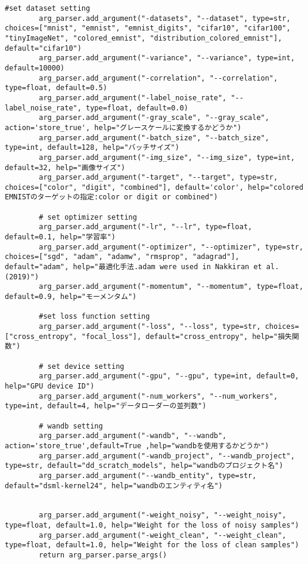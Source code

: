 \begin{lstlisting}[style=pythonstyle, caption={メインコード}]
        #set dataset setting
        arg_parser.add_argument("-datasets", "--dataset", type=str, choices=["mnist", "emnist", "emnist_digits", "cifar10", "cifar100", "tinyImageNet", "colored_emnist", "distribution_colored_emnist"], default="cifar10")
        arg_parser.add_argument("-variance", "--variance", type=int, default=10000)
        arg_parser.add_argument("-correlation", "--correlation", type=float, default=0.5)
        arg_parser.add_argument("-label_noise_rate", "--label_noise_rate", type=float, default=0.0) 
        arg_parser.add_argument("-gray_scale", "--gray_scale", action='store_true', help="グレースケールに変換するかどうか")
        arg_parser.add_argument("-batch_size", "--batch_size", type=int, default=128, help="バッチサイズ")
        arg_parser.add_argument("-img_size", "--img_size", type=int, default=32, help="画像サイズ")
        arg_parser.add_argument("-target", "--target", type=str, choices=["color", "digit", "combined"], default='color', help="colored EMNISTのターゲットの指定:color or digit or combined")
        
        # set optimizer setting
        arg_parser.add_argument("-lr", "--lr", type=float, default=0.1, help="学習率")
        arg_parser.add_argument("-optimizer", "--optimizer", type=str, choices=["sgd", "adam", "adamw", "rmsprop", "adagrad"], default="adam", help="最適化手法.adam were used in Nakkiran et al. (2019)")
        arg_parser.add_argument("-momentum", "--momentum", type=float, default=0.9, help="モーメンタム")
        
        #set loss function setting
        arg_parser.add_argument("-loss", "--loss", type=str, choices=["cross_entropy", "focal_loss"], default="cross_entropy", help="損失関数")
        
        # set device setting
        arg_parser.add_argument("-gpu", "--gpu", type=int, default=0, help="GPU device ID")
        arg_parser.add_argument("-num_workers", "--num_workers", type=int, default=4, help="データローダーの並列数")
        
        # wandb setting
        arg_parser.add_argument("-wandb", "--wandb", action='store_true',default=True ,help="wandbを使用するかどうか")
        arg_parser.add_argument("-wandb_project", "--wandb_project", type=str, default="dd_scratch_models", help="wandbのプロジェクト名")
        arg_parser.add_argument("--wandb_entity", type=str, default="dsml-kernel24", help="wandbのエンティティ名")
        
        
        arg_parser.add_argument("-weight_noisy", "--weight_noisy", type=float, default=1.0, help="Weight for the loss of noisy samples")
        arg_parser.add_argument("-weight_clean", "--weight_clean", type=float, default=1.0, help="Weight for the loss of clean samples")
        return arg_parser.parse_args()
    

\end{lstlisting}
